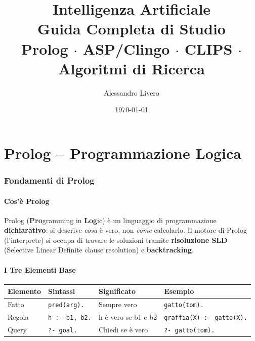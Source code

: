 \documentclass[12pt,a4paper]{article}
\title{
  \vspace{-1em}
  \Large\textbf{\color{blue!70!black}Intelligenza Artificiale}\\[0.4em]
  \large\textbf{Guida Completa di Studio}\\[0.3em]
  \normalsize Prolog $\cdot$ ASP/Clingo $\cdot$ CLIPS $\cdot$ Algoritmi di Ricerca
}
\author{Alessandro Livero}
\date{\today}
\begin{document}
\maketitle
\tableofcontents
\newpage

\part{Prolog -- Programmazione Logica}

\section{Fondamenti di Prolog}

\subsection{Cos'è Prolog}

Prolog (\textbf{Pro}gramming in \textbf{Log}ic) è un linguaggio di programmazione
\textbf{dichiarativo}: si descrive \emph{cosa} è vero, non \emph{come} calcolarlo.
Il motore di Prolog (l'interprete) si occupa di trovare le soluzioni tramite
\textbf{risoluzione SLD} (Selective Linear Definite clause resolution) e \textbf{backtracking}.

\subsection{I Tre Elementi Base}

\begin{center}
\renewcommand{\arraystretch}{1.4}
\begin{tabular}{llll}
\toprule
\textbf{Elemento} & \textbf{Sintassi} & \textbf{Significato} & \textbf{Esempio} \\
\midrule
Fatto & \texttt{pred(arg).} & Sempre vero & \texttt{gatto(tom).} \\
Regola & \texttt{h :- b1, b2.} & h è vero se b1 e b2 & \texttt{graffia(X) :- gatto(X).} \\
Query & \texttt{?- goal.} & Chiedi se è vero & \texttt{?- gatto(tom).} \\
\bottomrule
\end{tabular}
\end{center}
\end{document}
